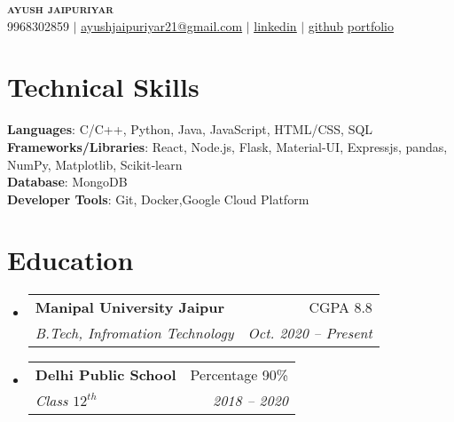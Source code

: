 \documentclass[a4paper,11pt]{article}
\makeatletter
\newcommand{\resumeSubheading}[4]{
    \vspace{-2pt}\item
    \begin{tabular*}{0.97\textwidth}[t]{l@{\extracolsep{\fill}}r}
        \textbf{#1} & #2 \\
        \textit{\small#3} & \textit{\small #4} \\
    \end{tabular*}\vspace{-7pt}
}
\newcommand{\resumeSubHeadingListStart}{\begin{itemize}[leftmargin=0.15in, label={}]}
\newcommand{\resumeSubHeadingListEnd}{\end{itemize}}
\makeatother
\begin{document}

\begin{center}
    \textbf{\Huge \scshape ayush jaipuriyar} \\ \vspace{1pt}
    \small 9968302859 $|$ \href{mailto:ayushjaipuriyar21@gmail.com}{\underline{ayushjaipuriyar21@gmail.com}} $|$
    \href{https://www.linkedin.com/in/ayushjaipuriyar}{\underline{linkedin}} $|$
    \href{https://github.com/ayushjaipuriyar/}{\underline{github}}
    \href{https://portfolio-ayushjaipuriyar.vercel.app/}{\underline{portfolio}}
\end{center}

%
\section{Technical Skills}
\begin{itemize}[leftmargin=0.15in, label={}]
    \small{\item{
                    \textbf{Languages}{: C/C++, Python, Java, JavaScript, HTML/CSS, SQL} \\
                    \textbf{Frameworks/Libraries}{: React, Node.js, Flask, Material-UI, Expressjs, pandas, NumPy, Matplotlib, Scikit‑learn} \\
                    \textbf{Database}{: MongoDB} \\
                    \textbf{Developer Tools}{: Git, Docker,Google Cloud Platform} \\
              }}
\end{itemize}

%

\section{Education}
\resumeSubHeadingListStart
\resumeSubheading
{Manipal University Jaipur}{CGPA 8.8}
{B.Tech, Infromation Technology}{Oct. 2020 -- Present}
\resumeSubheading
{Delhi Public School}{Percentage 90\%}
{Class $12^{th}$}{2018 -- 2020}
\resumeSubHeadingListEnd
\end{document}
